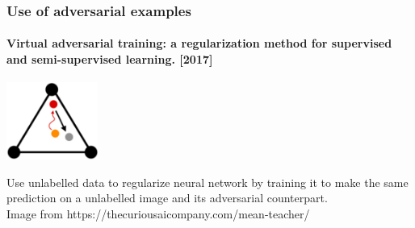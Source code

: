 \documentclass[9pt]{beamer}
\begin{document}
\begin{frame}

  \frametitle{Use of adversarial examples}

  \framesubtitle{Virtual adversarial training: a regularization method
    for supervised and semi-supervised learning. [2017]}

  \vspace{1cm}

  \begin{center}
    \includegraphics[width = 3cm]{images/vat.png}
  \end{center}

  \bigskip

  Use unlabelled data to regularize neural network by training it to
  make the same prediction on a unlabelled image and its adversarial
  counterpart.  \\[1.5cm]

  {\footnotesize Image from https://thecuriousaicompany.com/mean-teacher/}
\end{frame}
\end{document}
